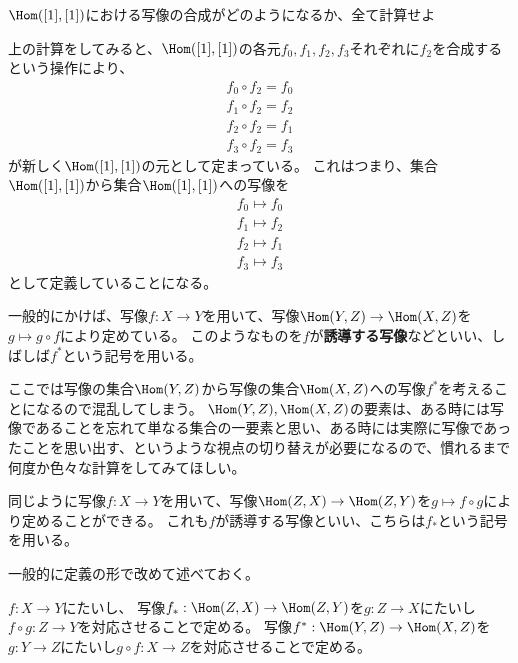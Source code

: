 \documentclass[uplatex]{jsarticle}
\begin{document}
\begin{prob}
$\Hom([1],[1])$における写像の合成がどのようになるか、全て計算せよ
\end{prob}

上の計算をしてみると、$\Hom([1], [1])$の各元$f_0, f_1, f_2, f_3$それぞれに$f_2$を合成するという操作により、
\begin{align*}
f_0\circ f_2=f_0\\
f_1 \circ f_2=f_2\\
f_2\circ f_2=f_1\\
f_3\circ f_2=f_3
\end{align*}
が新しく$\Hom([1], [1])$の元として定まっている。
これはつまり、集合$\Hom([1], [1])$から集合$\Hom([1], [1])$への写像を
\begin{align*}
f_0 \mapsto f_0\\
f_1 \mapsto f_2\\
f_2 \mapsto f_1\\
f_3 \mapsto f_3
\end{align*}
として定義していることになる。

一般的にかけば、写像$f:X \to Y$を用いて、写像$\Hom(Y,Z) \to \Hom(X,Z)$を$g \mapsto g \circ f$により定めている。
このようなものを$f$が\textbf{誘導する写像}などといい、しばしば$f^*$という記号を用いる。

\begin{rem}
ここでは写像の集合$\Hom(Y,Z)$から写像の集合$\Hom(X,Z)$への写像$f^*$を考えることになるので混乱してしまう。
$\Hom(Y,Z), \Hom(X,Z)$の要素は、ある時には写像であることを忘れて単なる集合の一要素と思い、ある時には実際に写像であったことを思い出す、というような視点の切り替えが必要になるので、慣れるまで何度か色々な計算をしてみてほしい。
\end{rem}

同じように写像$f:X \to Y$を用いて、写像$\Hom(Z,X) \to \Hom(Z,Y)$を$g \mapsto f \circ g$により定めることができる。
これも$f$が誘導する写像といい、こちらは$f_*$という記号を用いる。

一般的に定義の形で改めて述べておく。
\begin{dfn}
$f:X \to Y$にたいし、
写像$f_*:\Hom(Z,X)\to\Hom(Z,Y)$を$g:Z\to X$にたいし$f\circ g:Z\to Y$を対応させることで定める。
写像$f^*:\Hom(Y,Z)\to\Hom(X,Z)$を$g:Y\to Z$にたいし$g\circ f:X\to Z$を対応させることで定める。
\end{dfn}
\end{document}
